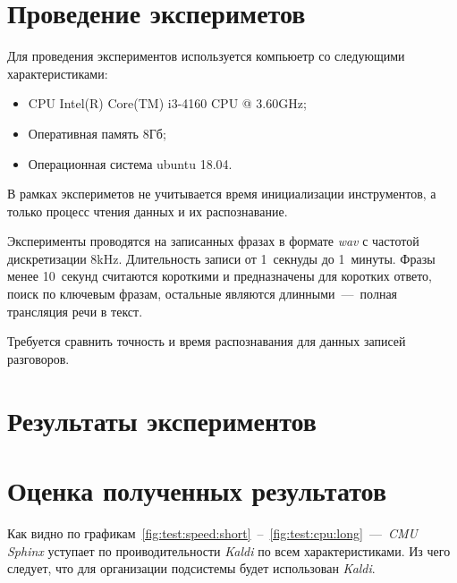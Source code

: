 


\section{Проведение экспериметов}
Для проведения экспериментов используется компьюетр со следующими характеристиками:
\begin{itemize}
    \item CPU Intel(R) Core(TM) i3-4160 CPU @ 3.60GHz;
    \item Оперативная память 8Гб;
    \item Операционная система ubuntu 18.04.
\end{itemize}

В рамках экспериметов не учитывается время инициализации инструментов, а только
процесс чтения данных и их распознавание.

Эксперименты проводятся на записанных фразах в формате \textit{wav} с частотой
дискретизации 8kHz. Длительность записи от 1~секнуды до 1~минуты.
Фразы менее 10~секунд считаются короткими и предназначены для коротких ответо,
поиск по ключевым фразам, остальные являются длинными~---~полная трансляция речи
в текст.

Требуется сравнить точность и время распознавания для данных записей разговоров.
\newpage
\section{Результаты экспериментов}

\section{Оценка полученных результатов}

Как видно по графикам~\ref{fig:test:speed:short}~--~\ref{fig:test:cpu:long}~---~\textit{CMU Sphinx}
уступает по проиводительности \textit{Kaldi} по всем характеристиками.
Из чего следует, что для организации подсистемы будет использован \textit{Kaldi}.
